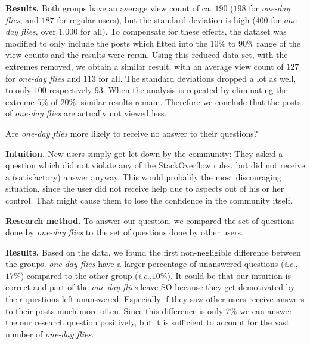 \documentclass[conference]{IEEEtran}
\newcommand{\ie}{\emph{i.e.},\xspace}
\newcommand\odf{\emph{one-day flies}\xspace}
\begin{document}
\textbf{Results.} Both groups have an average view count of ca. $190$ ($198$
for \odf, and $187$ for regular users), but the standard deviation is high
($400$ for \odf, over $1.000$ for all). To compensate for these
effects, the dataset was modified to only include the posts which fitted into
the $10\%$ to $90\%$ range of the view counts and the results were rerun.
Using this reduced data set, with the extremes removed, we obtain a similar
result, with an average view count of $127$ for \odf and $113$ for all. The standard deviations dropped a lot as well, to only $100$
respectively $93$. When the analysis is repeated by eliminating the extreme
$5\%$ of $20\%$, similar results remain. Therefore we conclude that the posts
of \odf are actually not viewed less.\\


\begin{tcolorbox}[size=fbox,title=RQ5: Unanswered Questions]
Are \odf more likely to receive no answer to their questions?
\end{tcolorbox}

\textbf{Intuition.} New users simply got let down by the community: They asked
a question which did not violate any of the StackOverflow rules, but did not
receive a (satisfactory) answer anyway. This would probably the most
discouraging situation, since the user did not receive help due to aspects out
of his or her control. That might cause them to lose the confidence in the
community itself. 
 
\textbf{Research method.} To answer our question, we compared the set of
questions done by \odf to the set of questions done by other users.

\textbf{Results.} Based on the data, we found the first non-negligible
difference between the groups. \odf have a larger percentage of unanswered
questions (\ie $17\%$) compared to the other group (\ie $10\%$). It could be
that our intuition is correct and part of the \odf leave SO because they get
demotivated by their questions left unanswered. Especially if they saw other
users receive answers to their posts much more often. Since this difference 
is only 7\% we can answer the our research question
positively, but it is sufficient to account for the vast number of \odf.
\end{document}
